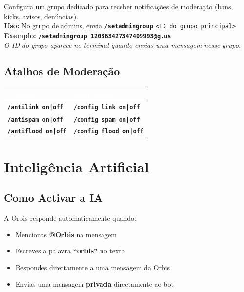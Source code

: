 \documentclass[12pt,a4paper]{article}
\newcommand{\cmd}[1]{\texttt{\textcolor{orbisblue}{\textbf{#1}}}}
\newcommand{\param}[1]{\texttt{\textcolor{orbisMid}{#1}}}
\begin{document}
\begin{tcolorbox}[cmdbox, title={\faBell\ /setadmingroup}]
Configura um grupo dedicado para receber notificações de moderação (bans, kicks, avisos, denúncias).\\
\textbf{Uso:} No grupo de admins, envia \cmd{/setadmingroup} \param{<ID do grupo principal>}\\
\textbf{Exemplo:} \cmd{/setadmingroup 120363427347409993@g.us}\\[4pt]
\textit{O ID do grupo aparece no terminal quando envias uma mensagem nesse grupo.}
\end{tcolorbox}

\subsection{Atalhos de Moderação}

\begin{center}
\begin{tabular}{L{5cm} L{8cm}}
\toprule
{}\textcolor{white}{\textbf{Comando}} & \textcolor{white}{\textbf{Equivalente a}} \\
\midrule
\cmd{/antilink on|off} & \cmd{/config link on|off} \\
\cmd{/antispam on|off} & \cmd{/config spam on|off} \\
\cmd{/antiflood on|off} & \cmd{/config flood on|off} \\
\bottomrule
\end{tabular}
\end{center}

\section{Inteligência Artificial}
\label{sec:ia}

\subsection{Como Activar a IA}

A Orbis responde automaticamente quando:

\begin{itemize}[leftmargin=1.5em, itemsep=3pt]
  \item Mencionas \textbf{@Orbis} na mensagem
  \item Escreves a palavra \textbf{``orbis''} no texto
  \item Respondes directamente a uma mensagem da Orbis
  \item Envias uma mensagem \textbf{privada} directamente ao bot
\end{itemize}
\end{document}
